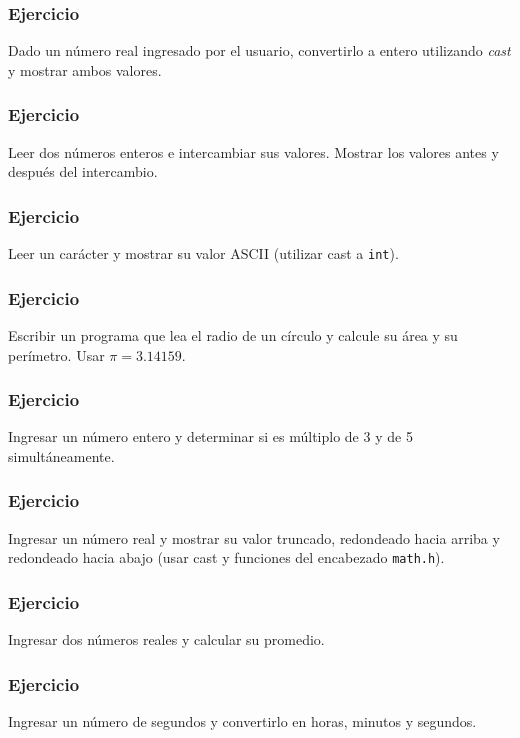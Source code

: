 \subsubsection{Ejercicio}
Dado un número real ingresado por el usuario, convertirlo a entero utilizando \textit{cast} y mostrar ambos valores.

\subsubsection{Ejercicio}
Leer dos números enteros e intercambiar sus valores. Mostrar los valores antes y después del intercambio.

\subsubsection{Ejercicio}
Leer un carácter y mostrar su valor ASCII (utilizar cast a \texttt{int}).

\subsubsection{Ejercicio}
Escribir un programa que lea el radio de un círculo y calcule su área y su perímetro.  
Usar \(\pi = 3.14159\).

\subsubsection{Ejercicio}
Ingresar un número entero y determinar si es múltiplo de 3 y de 5 simultáneamente.

\subsubsection{Ejercicio}
Ingresar un número real y mostrar su valor truncado, redondeado hacia arriba y redondeado hacia abajo (usar cast y funciones del encabezado \texttt{math.h}).

\subsubsection{Ejercicio}
Ingresar dos números reales y calcular su promedio.

\subsubsection{Ejercicio}
Ingresar un número de segundos y convertirlo en horas, minutos y segundos.

